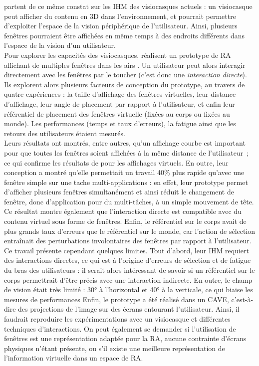 \cite{Ens2014} partent de ce même constat sur les IHM des visiocasques actuels : un visiocasque peut afficher du contenu en 3D dans l'environnement, et pourrait permettre d'exploiter l'espace de la vision périphérique de l'utilisateur. Ainsi, plusieurs fenêtres pourraient être affichées en même temps à des endroits différents dans l'espace de la vision d'un utilisateur.\\
Pour explorer les capacités des visiocasques, \citeauthor{Ens2014} réalisent un prototype de RA affichant de multiples fenêtres dans les airs . Un utilisateur peut alors interagir directement avec les fenêtres par le toucher (c'est donc une \emph{interaction directe}). Ils explorent alors plusieurs facteurs de conception du prototype, au travers de quatre expériences : la taille d'affichage des fenêtres virtuelles, leur distance d'affichage, leur angle de placement par rapport à l'utilisateur, et enfin leur référentiel de placement des fenêtres virtuelle (fixées au corps ou fixées au monde). Les performances (temps et taux d'erreurs), la fatigue ainsi que les retours des utilisateurs étaient mesurés.\\ 
Leurs résultats ont montrés, entre autres, qu'un affichage courbe est important pour que toutes les fenêtres soient affichées à la même distance de l'utilisateur~; ce qui confirme les résultats de \cite{ShuppBallYostEtAl2006} pour les affichages virtuels. En outre, leur conception a montré qu'elle permettait un travail 40\% plus rapide qu'avec une fenêtre simple sur une tache multi-applications : en effet, leur prototype permet d'afficher plusieurs fenêtres simultanément et ainsi réduit le changement de fenêtre, donc d'application pour du multi-tâches, à un simple mouvement de tête. Ce résultat montre également que l'interaction directe est compatible avec du contenu virtuel sous forme de fenêtres. Enfin, le référentiel sur le corps avait de plus grands taux d'erreurs que le référentiel sur le monde, car l'action de sélection entraînait des perturbations involontaires des fenêtres par rapport à l'utilisateur.\\ 
Ce travail présente cependant quelques limites. Tout d'abord, leur IHM requiert des interactions directes, ce qui est à l'origine d'erreurs de sélection et de fatigue du bras des utilisateurs : il serait alors intéressant de savoir si un référentiel sur le corps permettrait d'être précis avec une interaction indirecte. En outre, le champ de vision était très limité : 30° à l'horizontal et 40° à la verticale, ce qui biaise les mesures de performances Enfin, le prototype a été réalisé dans un CAVE, c'est-à-dire des projections de l'image sur des écrans entourant l'utilisateur. Ainsi, il faudrait reproduire les expérimentations avec un visiocasque et différentes techniques d'interactions. On peut également se demander si l'utilisation de fenêtres est une représentation adaptée pour la RA, aucune contrainte d'écrans physiques n'étant présente, ou s'il existe une meilleure représentation de l'information virtuelle dans un espace de RA.

